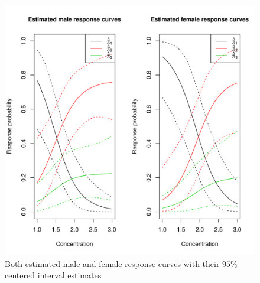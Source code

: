 \documentclass[]{article}
\begin{document}
\begin{enumerate}
{\begin{itemize}
        	\begin{figure}[ht!]
        		\centering
        		\includegraphics[scale = 0.5]{"pic/HW4_2/BERC_1"}
        		\caption{Both estimated male and female response curves with their $95\%$ centered interval estimates}
        		\label{3_BERC}
        	\end{figure}
        	
        \end{itemize}
        
}
\end{enumerate}
\end{document}

